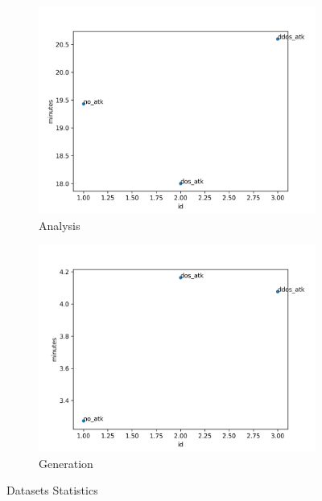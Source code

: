 \begin{figure}[H]
	\begin{subfigure}{0.24\textwidth}
		\includegraphics[width=\textwidth]{imgs/analysis_stat.png}
		\caption{Analysis} 
		\label{fig:analysis_stats}
	\end{subfigure}
	\hspace*{\fill} %
	\begin{subfigure}{0.24\textwidth}
		\includegraphics[width=\textwidth]{imgs/generation_stat.png}
		\caption{Generation} 
		\label{fig:generation_stats}
	\end{subfigure}
	\caption{Datasets Statistics}
	\label{fig:datasets_statistics}
\end{figure}

